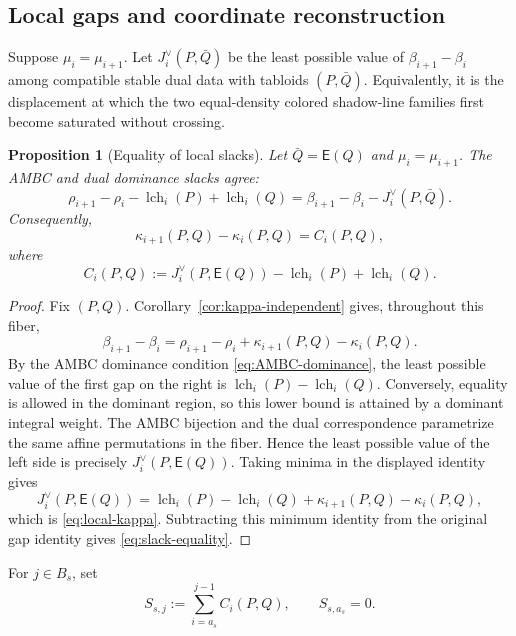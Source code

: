 \documentclass[11pt]{article}
\newtheorem{proposition}[theorem]{Proposition}
\theoremstyle{definition}
\theoremstyle{remark}
\newcommand{\lch}{\operatorname{lch}}
\newcommand{\E}{\mathsf E}
\begin{document}
\subsection{Local gaps and coordinate reconstruction}

Suppose \(\mu_i=\mu_{i+1}\).  Let \(J_i^\vee(P,\bar Q)\) be the least possible value of
\(\beta_{i+1}-\beta_i\) among compatible stable dual data with tabloids \((P,\bar Q)\).
Equivalently, it is the displacement at which the two equal-density colored shadow-line
families first become saturated without crossing.

\begin{proposition}[Equality of local slacks]\label{prop:local-slack}
Let \(\bar Q=\E(Q)\) and \(\mu_i=\mu_{i+1}\).  The AMBC and dual dominance slacks agree:
\begin{equation}\label{eq:slack-equality}
 \rho_{i+1}-\rho_i-\lch_i(P)+\lch_i(Q)
 =\beta_{i+1}-\beta_i-J_i^\vee(P,\bar Q).
\end{equation}
Consequently,
\begin{equation}\label{eq:local-kappa}
 \kappa_{i+1}(P,Q)-\kappa_i(P,Q)=C_i(P,Q),
\end{equation}
where
\begin{equation}\label{eq:C}
 C_i(P,Q):=J_i^\vee(P,\E(Q))-\lch_i(P)+\lch_i(Q).
\end{equation}
\end{proposition}

\begin{proof}
Fix \((P,Q)\).  Corollary~\ref{cor:kappa-independent} gives, throughout this fiber,
\[
 \beta_{i+1}-\beta_i
 =\rho_{i+1}-\rho_i+\kappa_{i+1}(P,Q)-\kappa_i(P,Q).
\]
By the AMBC dominance condition \eqref{eq:AMBC-dominance}, the least possible value of
the first gap on the right is
\(\lch_i(P)-\lch_i(Q)\).  Conversely, equality is allowed in the dominant region, so
this lower bound is attained by a dominant integral weight.  The AMBC bijection and the
dual correspondence parametrize the same affine permutations in the fiber.  Hence the
least possible value of the left side is precisely
\(J_i^\vee(P,\E(Q))\).  Taking minima in the displayed identity gives
\[
 J_i^\vee(P,\E(Q))
 =\lch_i(P)-\lch_i(Q)
   +\kappa_{i+1}(P,Q)-\kappa_i(P,Q),
\]
which is \eqref{eq:local-kappa}.  Subtracting this minimum identity from the original
gap identity gives \eqref{eq:slack-equality}.
\end{proof}

For \(j\in B_s\), set
\begin{equation}\label{eq:Ssj}
 S_{s,j}:=\sum_{i=a_s}^{j-1}C_i(P,Q),
 \qquad S_{s,a_s}=0.
\end{equation}
\end{document}
